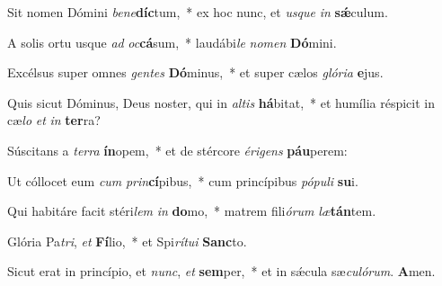 ﻿\setcounter{versecount}{2}

\vs Sit nomen Dómini \textit{be}\textit{ne}\textbf{díc}tum,~* ex hoc nunc, et \textit{us}\textit{que} \textit{in} \textbf{sǽ}culum.

\vs A solis ortu usque \textit{ad} \textit{oc}\textbf{cá}sum,~* laudábi\textit{le} \textit{no}\textit{men} \textbf{Dó}mini.

\vs Excélsus super omnes \textit{gen}\textit{tes} \textbf{Dó}\-mi\-nus,~* et super cælos \textit{gló}\textit{ri}\textit{a} \textbf{e}jus.

\vs Quis sicut Dóminus, Deus noster, qui in \textit{al}\textit{tis} \textbf{há}bitat,~* et humília réspicit in cæ\textit{lo} \textit{et} \textit{in} \textbf{ter}ra?

\vs Súscitans a \textit{ter}\textit{ra} \textbf{ín}opem,~* et de stércore \textit{é}\textit{ri}\textit{gens} \textbf{páu}perem:

\vs Ut cóllocet eum \textit{cum} \textit{prin}\textbf{cí}pibus,~* cum princípibus \textit{pó}\textit{pu}\textit{li} \textbf{su}i.

\vs Qui habitáre facit stéri\textit{lem} \textit{in} \textbf{do}mo,~* matrem fili\textit{ó}\textit{rum} \textit{læ}\textbf{tán}tem.

\vs Glória Pa\textit{tri}, \textit{et} \textbf{Fí}lio,~* et Spi\textit{rí}\textit{tu}\textit{i} \textbf{Sanc}to.

\vs Sicut erat in princípio, et \textit{nunc}, \textit{et} \textbf{sem}per,~* et in sǽcula sæ\textit{cu}\textit{ló}\textit{rum}. \textbf{A}men.

